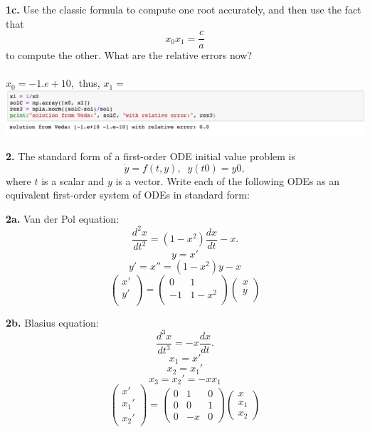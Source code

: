 \documentclass[11pt]{article}
\begin{document}
\par\medskip
{\bf 1c.}
Use the classic formula to compute one root accurately, and then use the
fact that
$$ x_0x_1 = \frac{c}{a} $$
to compute the other.
What are the relative errors now?\\\\
$x_0 = -1.e+10,$ thus, $x_1 = $\\
\includegraphics{1c.png}

\par\bigskip
{\bf 2.}
The standard form of a first-order ODE initial value problem is
$$ \dot y = f(t, y), \;\; y(t0) = y0, $$
where $t$ is a scalar and $y$ is a vector.
Write each of the following ODEs as an equivalent first-order system
of ODEs in standard form:

\par\bigskip
{\bf 2a.} Van der Pol equation:
$$ \frac{d^2 x}{dt^2} = (1-x^2)\frac{dx}{dt} - x . $$
$$y = x'$$ 
$$y'=x''=(1-x^2)y-x$$
$$\left(
   \begin{array}{c}
      x' \\ 	
      y' \\ 	
   \end{array} \right)=
   \left(
   \begin{array}{cc}
      0&1 \\ 	
      -1&1-x^2 \\ 	
   \end{array} \right)
   \left(
   \begin{array}{c}
      x \\ 	
      y\\ 	
   \end{array} \right)$$

\par\bigskip
{\bf 2b.} Blasius equation:
$$ \frac{d^3 x}{dt^3} = -x\frac{dx}{dt}. $$
$$x_1 = x'$$ 
$$x_2 = x_1'$$
$$x_3=x_2'=-xx_1$$
$$\left(
   \begin{array}{c}
      x' \\ 	
      x_1' \\
      x_2' 	
   \end{array} \right)=
   \left(
   \begin{array}{ccc}
      0&1&0 \\ 	
      0&0&1 \\
      0&-x&0 	
   \end{array} \right)
   \left(
   \begin{array}{c}
      x \\ 	
      x_1\\
      x_2 	
   \end{array} \right)$$
\end{document}
